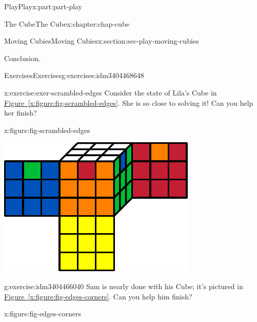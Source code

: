 \documentclass[oneside,10pt,]{book}
\newcommand{\xreffont}{\relax}
\numberwithin{equation}{section}
\begin{document}
\begin{partptx}{Play}{}{Play}{}{}{x:part:part-play}
\begin{chapterptx}{The Cube}{}{The Cube}{}{}{x:chapter:chap-cube}
\begin{sectionptx}{Moving Cubies}{}{Moving Cubies}{}{}{x:section:sec-play-moving-cubies}
\begin{conclusion}{Conclusion.}
\end{conclusion}%
%
%
\typeout{************************************************}
\typeout{************************************************}
%
\begin{exercises-subsection-numberless}{Exercises}{}{Exercises}{}{}{g:exercises:idm3404468648}
\begin{divisionexercise}{1}{}{}{x:exercise:exer-scrambled-edges}%
Consider the state of Lila's Cube in \hyperref[x:figure:fig-scrambled-edges]{Figure~{\xreffont\ref{x:figure:fig-scrambled-edges}}}. She is so close to solving it! Can you help her finish?%
\begin{figureptx}{}{x:figure:fig-scrambled-edges}{}%
\begin{image}{0.25}{0.5}{0.25}%
\includegraphics[width=\linewidth]{./images/scrambled_edges.pdf}
\end{image}%
\tcblower
\end{figureptx}%
\end{divisionexercise}%
\begin{divisionexercise}{2}{}{}{g:exercise:idm3404466040}%
Sam is nearly done with his Cube; it's pictured in \hyperref[x:figure:fig-edges-corners]{Figure~{\xreffont\ref{x:figure:fig-edges-corners}}}. Can you help him finish?%
\begin{figureptx}{}{x:figure:fig-edges-corners}{}%
\begin{image}{0.25}{0.5}{0.25}%

\end{image}
\end{figureptx}
\end{divisionexercise}
\end{exercises-subsection-numberless}
\end{sectionptx}
\end{chapterptx}
\end{partptx}
\end{document}
